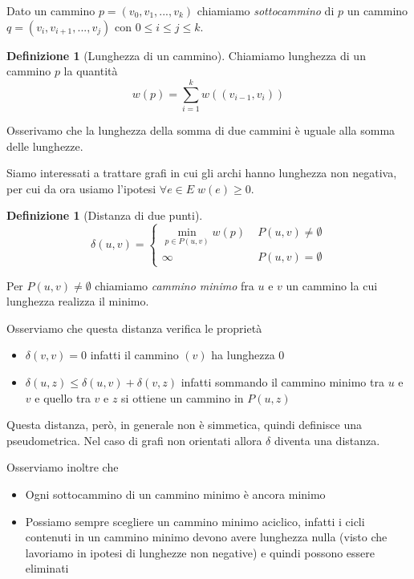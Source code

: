 \documentclass[a4paper,10pt]{amsbook}
\newcounter{counter1}
\theoremstyle{plain}
\theoremstyle{definition}
\newtheorem{mydef}[counter1]{Definizione}
\theoremstyle{remark}
\newcommand{\pa}[1]{\left(#1\right)}
\begin{document}
Dato un cammino $p = ( v_0, v_1, ..., v_k)$ chiamiamo
\textit{sottocammino} di $p$ un cammino $q = ( v_i , v_{i+1}, ... ,
v_j )$ con $0 \le i \le j \le k$.

\begin{mydef}[Lunghezza di un cammino]
  Chiamiamo lunghezza di un cammino $p$ la quantità
  \[ w(p) = \sum _{i=1} ^k w \pa{ (v_{i-1}, v_i) } \]
\end{mydef}

Osserivamo che la lunghezza della somma di due cammini è uguale alla
somma delle lunghezze.

Siamo interessati a trattare grafi in cui gli archi hanno lunghezza
non negativa, per cui da ora usiamo l'ipotesi $\forall e \in E \; w(e)
\ge 0$.

\begin{mydef}[Distanza di due punti]
  \[ \delta(u,v) = \left\{
    \begin{matrix}
      \min \limits_{p \in P(u,v)} { w(p) } & \; P(u,v) \neq \emptyset \\
      \infty & \; P(u,v) = \emptyset
    \end{matrix}
    \right.
    \]
\end{mydef}

Per $P(u,v) \neq \emptyset$ chiamiamo \textit{cammino minimo} fra $u$
e $v$ un cammino la cui lunghezza realizza il minimo.

Osserviamo che questa distanza verifica le proprietà
\begin{itemize}
\item $\delta(v,v) = 0$ infatti il cammino $(v)$ ha lunghezza $0$
\item $\delta(u,z) \le \delta(u,v) + \delta(v,z)$ infatti sommando il
  cammino minimo tra $u$ e $v$ e quello tra $v$ e $z$ si ottiene un
  cammino in $P(u,z)$
\end{itemize}
Questa distanza, però, in generale non è simmetica, quindi definisce
una pseudometrica. Nel caso di grafi non orientati allora $\delta$
diventa una distanza.

Osserviamo inoltre che
\begin{itemize}
\item Ogni sottocammino di un cammino minimo è ancora minimo
\item Possiamo sempre scegliere un cammino minimo aciclico, infatti i
  cicli contenuti in un cammino minimo devono avere lunghezza nulla
  (visto che lavoriamo in ipotesi di lunghezze non negative) e quindi
  possono essere eliminati
\end{itemize}
\end{document}
